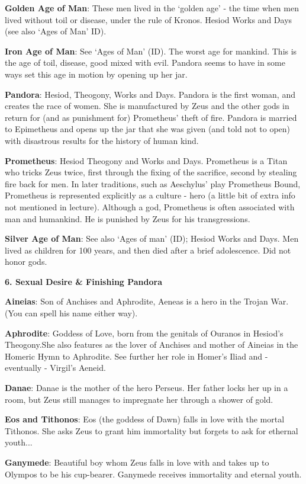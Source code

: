 \documentclass{scrartcl}
\begin{document}
\begin{multicols*}{3}
{\bf Golden Age of Man}: These men lived in the `golden age' - the time when men lived without toil or disease, under the rule of Kronos. 
Hesiod Works and Days (see also `Ages of Man' ID).

{\bf Iron Age of Man}: See `Ages of Man' (ID). The worst age for mankind. This is the age of toil, disease, good mixed with evil. Pandora seems to have in some ways set this age in motion by opening up her jar.

{\bf Pandora}: Hesiod, Theogony, Works and Days. Pandora is the first woman, and creates the race of women. She is manufactured by Zeus and the other gods in return for (and as punishment for) Prometheus' theft of fire. Pandora is married to Epimetheus and opens up the jar that she was given (and told not to open) with disastrous results for the history of human kind.

{\bf Prometheus}: Hesiod Theogony and Works and Days. Prometheus is a Titan who tricks Zeus twice, first through the fixing of the sacrifice, second by stealing fire back for men. In later traditions, such as Aeschylus' play Prometheus Bound, Prometheus is represented explicitly as a culture - hero (a little bit of extra info not mentioned in lecture). Although a god, Prometheus is often associated with man and humankind. He is punished by Zeus for his transgressions.

{\bf Silver Age of Man}: See also `Ages of man' (ID); Hesiod Works and Days.  Men lived as children for 100 years, and then died after a brief adolescence. Did not honor gods.


{\bf 6. Sexual Desire \& Finishing Pandora}

{\bf Aineias}: Son of Anchises and Aphrodite, Aeneas is a hero in the Trojan War.(You can spell his name either way).

{\bf Aphrodite}: Goddess of Love, born from the genitals of Ouranos in Hesiod's Theogony.She also features as the lover of Anchises and mother of Aineias in the Homeric Hymn to Aphrodite. See further her role in Homer's Iliad and - eventually - Virgil's Aeneid.

{\bf Danae}: Danae is the mother of the hero Perseus. Her father locks her up in a room, but Zeus still manages to impregnate her through a shower of gold.

{\bf Eos and Tithonos}: Eos (the goddess of Dawn) falls in love with the mortal Tithonos. She asks Zeus to grant him immortality but forgets to ask for ethernal youth...

{\bf Ganymede}: Beautiful boy whom Zeus falls in love with and takes up to Olympos to be his cup-bearer. Ganymede receives immortality and eternal youth.


\end{multicols*}
\end{document}
